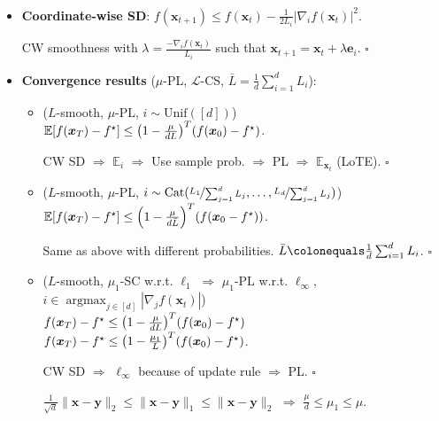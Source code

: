 \documentclass[8pt,a4paper]{extarticle}
\renewcommand{\proof}[1]{\begin{tcolorbox}#1 \hfill $\square$\end{tcolorbox}}
\DeclareMathOperator*{\argmax}{argmax}
\newcommand{\lft}{\mathopen{}\mathclose\bgroup\left}
\newcommand{\rgt}{\aftergroup\egroup\right}
\newcommand{\E}{\mathbb{E}}
\renewcommand{\vec}[1]{\bm{#1}}
\newenvironment{topic}[1]
{\textbf{\sffamily \colorbox{black}{\rlap{\textbf{\textcolor{white}{#1}}}\hspace{\linewidth}\hspace{-2\fboxsep}}} \\ \vspace{0.2cm}}
{}
\begin{document}
\begin{multicols*}{2}
    \begin{topic}{Coordinate descent}
        \begin{itemize}
            \item \textbf{Coordinate-wise SD}: $f(\vec{x}_{t+1}) \leq f(\vec{x}_t) - \frac{1}{2L_i} |\nabla_i f(\vec{x}_t)|^2$.
                  \proof{CW smoothness with $\lambda = \frac{-\nabla_i f(\vec{x}_t)}{L_i}$ such that $\vec{x}_{t+1} = \vec{x}_t + \lambda \vec{e}_i$.}
            \item \textbf{Convergence results} ($\mu$-PL, $\mathcal{L}$-CS, $\bar{L} = \frac{1}{d} \sum_{i=1}^{d} L_i$):
                  \begin{itemize}
                      \item ($L$-smooth, $\mu$-PL, $i \sim \mathrm{Unif}([d])$) \\
                            $\E[f(\vec{x}_T) - f^\star] \leq \lft( 1 - \frac{\mu}{dL} \rgt)^T(f(\vec{x}_0) - f^\star)$.
                            \proof{CW SD $\Rightarrow$ $\E_i$ $\Rightarrow$ Use sample prob. $\Rightarrow$ PL $\Rightarrow$ $\E_{\vec{x}_t}$ (LoTE).}
                      \item ($L$-smooth, $\mu$-PL, $i \sim \mathrm{Cat}(\nicefrac{L_1}{\sum_{j=1}^{d} L_j}, \ldots, \nicefrac{L_d}{\sum_{j=1}^{d} L_j})$) \\
                            $\E[f(\vec{x}_T) - f^\star] \leq \lft( 1 - \frac{\mu}{d \bar{L}} \rgt)^T (f(\vec{x}_0 - f^\star))$.
                            \proof{Same as above with different probabilities. $\bar{L} \colonequals \frac{1}{d} \sum_{i=1}^{d} L_i$.}
                      \item ($L$-smooth, $\mu_1$-SC w.r.t. $\ell_1$ $\Rightarrow$ $\mu_1$-PL w.r.t. $\ell_{\infty}$, $i \in \argmax_{j\in[d]} |\nabla_j f(\vec{x}_t)|$) \\
                            $f(\vec{x}_T) - f^\star \leq \lft( 1 - \frac{\mu}{dL} \rgt)^T (f(\vec{x}_0) - f^\star)$ \\
                            $f(\vec{x}_T) - f^\star \leq \lft( 1 - \frac{\mu_1}{L} \rgt)^T (f(\vec{x}_0) - f^\star)$.
                            \proof{CW SD $\Rightarrow$ $\ell_{\infty}$ because of update rule $\Rightarrow$ PL.}
                            $\frac{1}{\sqrt{d}} \| \vec{x} - \vec{y} \|_2 \leq \| \vec{x} - \vec{y} \|_1 \leq \| \vec{x} - \vec{y} \|_2$ $\Rightarrow$ $\frac{\mu}{d} \leq \mu_1 \leq \mu$.
                  \end{itemize}
        \end{itemize}
    \end{topic}


\end{multicols*}
\end{document}
